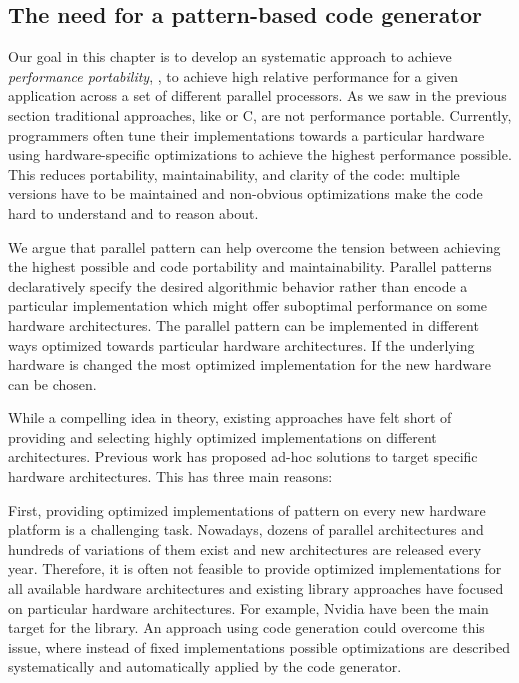 
\subsection{The need for a pattern-based code generator}

Our goal in this chapter is to develop an systematic approach to achieve \emph{performance portability}, \ie, to achieve high relative performance for a given application across a set of different parallel processors.
As we saw in the previous section traditional approaches, like \OpenCL or C, are not performance portable.
Currently, programmers often tune their implementations towards a particular hardware using hardware-specific optimizations to achieve the highest performance possible.
This reduces portability, maintainability, and clarity of the code:
multiple versions have to be maintained and non-obvious optimizations make the code hard to understand and to reason about.

We argue that parallel pattern can help overcome the tension between achieving the highest possible and code portability and maintainability.
Parallel patterns declaratively specify the desired algorithmic behavior rather than encode a particular implementation which might offer suboptimal performance on some hardware architectures.
The parallel pattern can be implemented in different ways optimized towards particular hardware architectures.
If the underlying hardware is changed the most optimized implementation for the new hardware can be chosen.

While a compelling idea in theory, existing approaches have felt short of providing and selecting highly optimized implementations on different architectures.
Previous work has proposed ad-hoc solutions to target specific hardware architectures.
This has three main reasons:

First, providing optimized implementations of pattern on every new hardware platform is a challenging task.
Nowadays, dozens of parallel architectures and hundreds of variations of them exist and new architectures are released every year.
Therefore, it is often not feasible to provide optimized implementations for all available hardware architectures and existing library approaches have focused on particular hardware architectures.
For example, Nvidia \GPUs have been the main target for the \SkelCL library.
An approach using code generation could overcome this issue, where instead of fixed implementations possible optimizations are described systematically and automatically applied by the code generator.


